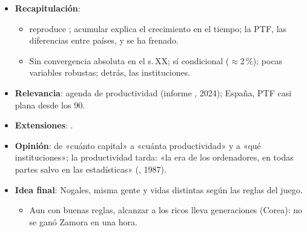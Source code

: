 \documentclass{article}
\begin{document}
\begin{columnas}
\begin{itemize}
\item \textbf{Recapitulación}:
  \begin{itemize}
  \item {} reproduce ; acumular explica el crecimiento en el tiempo; la PTF, las diferencias entre países, y se ha frenado.
  \item Sin convergencia absoluta en el s.\,XX; sí condicional ($\approx$2\,\%); pocas variables robustas; detrás, las instituciones.
  \end{itemize}
\item \textbf{Relevancia}: agenda de productividad (informe , 2024); España, PTF casi plana desde los 90.
\item \textbf{Extensiones}:     .
\item \textbf{Opinión}: de «cuánto capital» a «cuánta productividad» y a «qué instituciones»; la productividad tarda: «la era de los ordenadores, en todas partes salvo en las estadísticas» (, 1987).
\item \textbf{Idea final}: Nogales, misma gente y vidas distintas según las reglas del juego.
  \begin{itemize}
  \item Aun con buenas reglas, alcanzar a los ricos lleva generaciones (Corea): no se ganó Zamora en una hora.
  \end{itemize}
\end{itemize}


\end{columnas}
\end{document}
